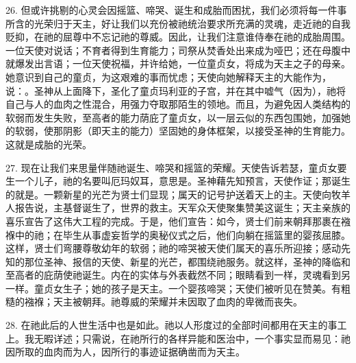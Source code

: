 26. 但或许挑剔的心灵会因摇篮、啼哭、诞生和成胎而困扰，我们必须将每一件事所含的光荣归于天主，好让我们以充份被祂统治要求所充满的灵魂，走近祂的自我贬抑，在祂的屈尊中不忘记祂的尊威。因此，让我们注意谁侍奉在祂的成胎周围。一位天使对说话；不育者得到生育能力；司祭从焚香处出来成为哑巴；还在母腹中就爆发出言语；一位天使祝福，并许给她，一位童贞女，将成为天主之子的母亲。她意识到自己的童贞，为这艰难的事而忧虑；天使向她解释天主的大能作为，说：。圣神从上面降下，圣化了童贞玛利亚的子宫，并在其中嘘气（因为），祂将自己与人的血肉之性混合，用强力夺取那陌生的领地。而且，为避免因人类结构的软弱而发生失败，至高者的能力荫庇了童贞女，以一层云似的东西包围她，加强她的软弱，使那阴影（即天主的能力）坚固她的身体框架，以接受圣神的生育能力。这就是成胎的光荣。\par

27. 现在让我们来思量伴随祂诞生、啼哭和摇篮的荣耀。天使告诉若瑟，童贞女要生一个儿子，祂的名要叫厄玛奴耳，意思是。圣神藉先知预言，天使作证；那诞生的就是。一颗新星的光芒为贤士们显现；属天的记号护送着天上的主。天使向牧羊人报告说，主基督诞生了，世界的救主。天军众天使聚集赞美这诞生；天主亲族的喜乐宣告了这伟大工程的完成。于是，他们宣告：如今，贤士们前来朝拜那裹在襁褓中的祂；在毕生从事虚妄哲学的奥秘仪式之后，他们向躺在摇篮里的婴孩屈膝。这样，贤士们弯腰尊敬幼年的软弱；祂的啼哭被天使们属天的喜乐所迎接；感动先知的那位圣神、报信的天使、新星的光芒，都围绕祂服务。就这样，圣神的降临和至高者的庇荫使祂诞生。内在的实体与外表截然不同；眼睛看到一样，灵魂看到另一样。童贞女生子；她的孩子是天主。一个婴孩啼哭；天使们被听见在赞美。有粗糙的襁褓；天主被朝拜。祂尊威的荣耀并未因取了血肉的卑微而丧失。\par

28. 在祂此后的人世生活中也是如此。祂以人形度过的全部时间都用在天主的事工上。我无暇详述；只需说，在祂所行的各样异能和医治中，一个事实显而易见：祂因所取的血肉而为人，因所行的事迹证据确凿而为天主。\par

